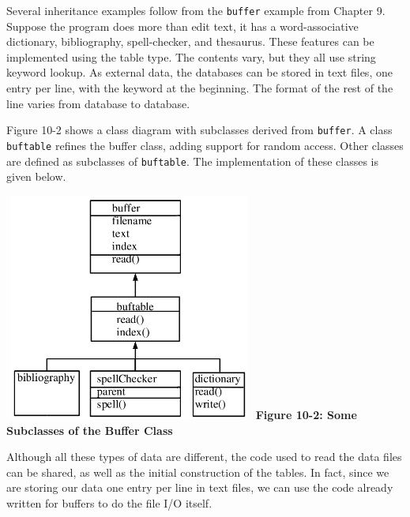 Several inheritance examples follow from the \texttt{buffer}
example from Chapter 9. Suppose the program does more than
edit text, it has a word-associative
dictionary, bibliography, spell-checker, and thesaurus. These
features can be implemented using the table type.
The contents vary, but they all use string
keyword lookup. As external data, the databases can be stored in text
files, one entry per line, with the keyword at the beginning. The
format of the rest of the line varies from database to database.

Figure 10-2 shows a class diagram with subclasses derived from
\texttt{buffer}. A class \texttt{buftable} refines the
buffer class, adding support for random access. Other classes are
defined as subclasses of \texttt{buftable}. The implementation of these
classes is given below.


\begin{center}
\includegraphics[width=3.24in,height=2.95in]{ub-img/ub-img43.png}
\linebreak
{\sffamily\bfseries Figure 10-2: Some Subclasses of the Buffer Class}
\end{center}

\bigskip

Although all these types of data are different, the code used to read
the data files can be shared, as well as the initial construction of
the tables. In fact, since we are storing our data one entry per line
in text files, we can use the code already written for buffers to do
the file I/O itself. 



